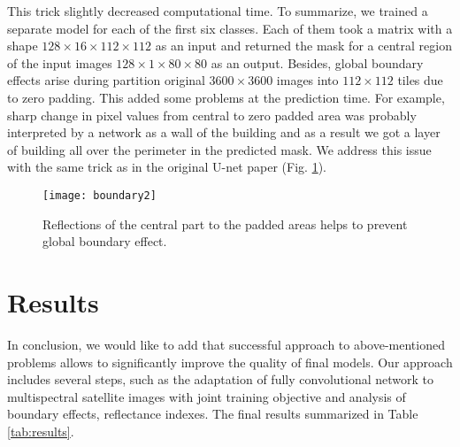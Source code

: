 \documentclass[10pt,twocolumn,letterpaper]{article}
\begin{document}
This trick slightly decreased computational time. To summarize, we trained a separate model for each of the first six classes. Each of them took a matrix with a shape $128 \times 16 \times 112 \times 112$ as an input and returned the mask for a central region of the input images $128 \times 1 \times 80 \times 80$ as an output. Besides, global boundary effects arise during partition original $3600 \times 3600$ images into $112 \times 112$ tiles due to zero padding. This added some problems at the prediction time. For example, sharp change in pixel values from central to zero padded area was probably interpreted by a network as a wall of the building and as a result we got a layer of building all over the perimeter in the predicted mask. We address this issue with the same trick as in the original U-net paper \cite{unet} (Fig. \ref{fig:boundary2}).

\begin{figure}[!h]
	\captionsetup{justification=centering}
	\centering
	\texttt{[image: boundary2]}
	\caption{Reflections of the central part to the padded areas helps to prevent global boundary effect.}
	\label{fig:boundary2}
\end{figure}


\section{Results}

In conclusion, we would like to add that successful approach to above-mentioned problems allows to significantly improve the quality of final models. Our approach includes several steps, such as the adaptation of fully convolutional network to multispectral satellite images with joint training objective and analysis of boundary effects, reflectance indexes. The final results summarized in Table \ref{tab:results}.
\end{document}
